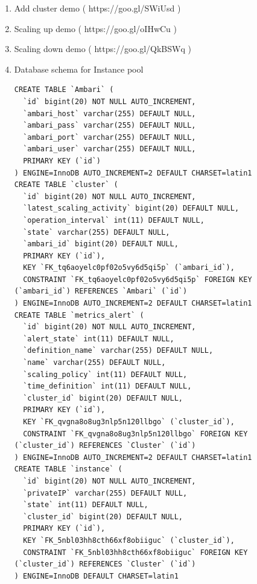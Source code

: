 \documentclass{article}
\begin{document}
\begin{enumerate}

\item Add cluster demo ( https://goo.gl/SWiUsd )
\item Scaling up demo ( https://goo.gl/oIHwCu )
\item Scaling down demo ( https://goo.gl/QkBSWq )

\item Database schema for Instance pool
\begin{lstlisting}
CREATE TABLE `Ambari` (
  `id` bigint(20) NOT NULL AUTO_INCREMENT,
  `ambari_host` varchar(255) DEFAULT NULL,
  `ambari_pass` varchar(255) DEFAULT NULL,
  `ambari_port` varchar(255) DEFAULT NULL,
  `ambari_user` varchar(255) DEFAULT NULL,
  PRIMARY KEY (`id`)
) ENGINE=InnoDB AUTO_INCREMENT=2 DEFAULT CHARSET=latin1 
CREATE TABLE `cluster` (
  `id` bigint(20) NOT NULL AUTO_INCREMENT,
  `latest_scaling_activity` bigint(20) DEFAULT NULL,
  `operation_interval` int(11) DEFAULT NULL,
  `state` varchar(255) DEFAULT NULL,
  `ambari_id` bigint(20) DEFAULT NULL,
  PRIMARY KEY (`id`),
  KEY `FK_tq6aoyelc0pf02o5vy6d5qi5p` (`ambari_id`),
  CONSTRAINT `FK_tq6aoyelc0pf02o5vy6d5qi5p` FOREIGN KEY (`ambari_id`) REFERENCES `Ambari` (`id`)
) ENGINE=InnoDB AUTO_INCREMENT=2 DEFAULT CHARSET=latin1 
CREATE TABLE `metrics_alert` (
  `id` bigint(20) NOT NULL AUTO_INCREMENT,
  `alert_state` int(11) DEFAULT NULL,
  `definition_name` varchar(255) DEFAULT NULL,
  `name` varchar(255) DEFAULT NULL,
  `scaling_policy` int(11) DEFAULT NULL,
  `time_definition` int(11) DEFAULT NULL,
  `cluster_id` bigint(20) DEFAULT NULL,
  PRIMARY KEY (`id`),
  KEY `FK_qvgna8o8ug3nlp5n120llbgo` (`cluster_id`),
  CONSTRAINT `FK_qvgna8o8ug3nlp5n120llbgo` FOREIGN KEY (`cluster_id`) REFERENCES `Cluster` (`id`)
) ENGINE=InnoDB AUTO_INCREMENT=2 DEFAULT CHARSET=latin1 
CREATE TABLE `instance` (
  `id` bigint(20) NOT NULL AUTO_INCREMENT,
  `privateIP` varchar(255) DEFAULT NULL,
  `state` int(11) DEFAULT NULL,
  `cluster_id` bigint(20) DEFAULT NULL,
  PRIMARY KEY (`id`),
  KEY `FK_5nbl03hh8cth66xf8obiiguc` (`cluster_id`),
  CONSTRAINT `FK_5nbl03hh8cth66xf8obiiguc` FOREIGN KEY (`cluster_id`) REFERENCES `Cluster` (`id`)
) ENGINE=InnoDB DEFAULT CHARSET=latin1
\end{lstlisting}

\end{enumerate}
\end{document}
